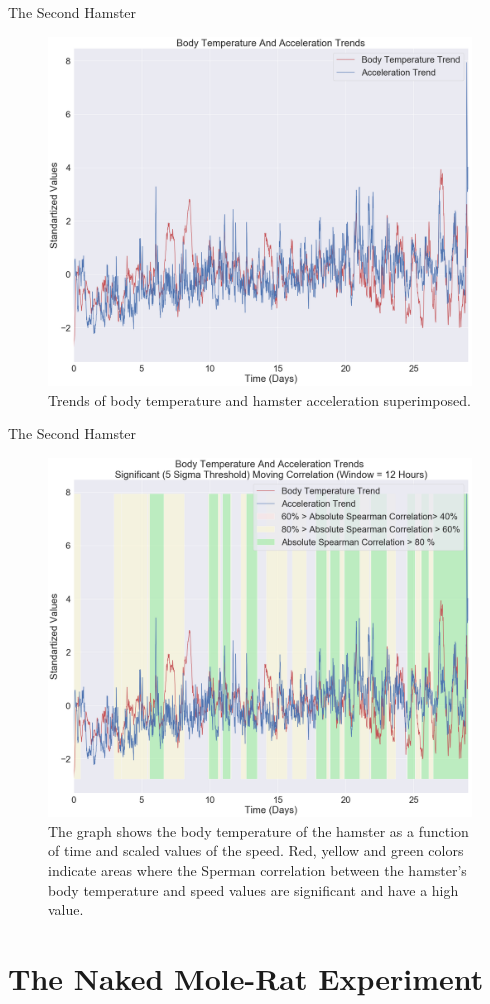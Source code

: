 \documentclass[10pt]{beamer}
\begin{document}
\begin{frame}[fragile]{The Second Hamster}
\begin{figure}[H]
\centering
\includegraphics[width=0.6\linewidth]{exp2_2.png}
\caption{Trends of body temperature and hamster acceleration superimposed.}\label{fig:lactate_receptors}
\end{figure}
\end{frame}

\begin{frame}[fragile]{The Second Hamster}
\begin{figure}[H]
\centering
\includegraphics[width=0.6\linewidth]{exp2_3.png}
\caption{The graph shows the body temperature of the hamster as a function of time and scaled values of the speed. Red, yellow and green colors indicate areas where the Sperman correlation between the hamster's body temperature and speed values are significant and have a high value.}\label{fig:lactate_receptors}
\end{figure}
\end{frame}

\section{The Naked Mole-Rat Experiment}
\end{document}
